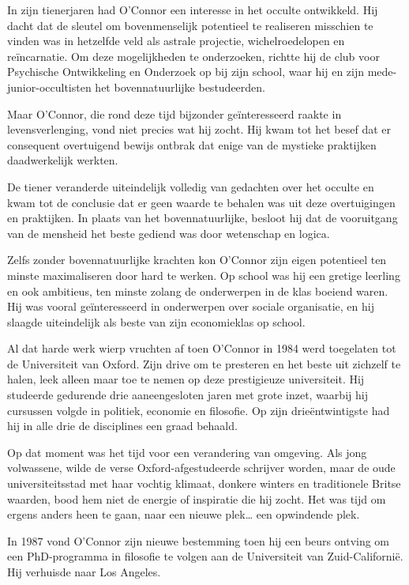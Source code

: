 \documentclass[
  a5paper,
  smalldemyvopaper,11pt,twoside,onecolumn,openright,extrafontsizes,
hidelinks]{memoir}
\begin{document}
In zijn tienerjaren had O'Connor een interesse in het occulte
ontwikkeld. Hij dacht dat de sleutel om bovenmenselijk potentieel te
realiseren misschien te vinden was in hetzelfde veld als astrale
projectie, wichelroedelopen en reïncarnatie. Om deze mogelijkheden te
onderzoeken, richtte hij de club voor Psychische Ontwikkeling en
Onderzoek op bij zijn school, waar hij en zijn mede-junior-occultisten
het bovennatuurlijke bestudeerden.

Maar O'Connor, die rond deze tijd bijzonder geïnteresseerd raakte in
levensverlenging, vond niet precies wat hij zocht. Hij kwam tot het
besef dat er consequent overtuigend bewijs ontbrak dat enige van de
mystieke praktijken daadwerkelijk werkten.

De tiener veranderde uiteindelijk volledig van gedachten over het
occulte en kwam tot de conclusie dat er geen waarde te behalen was uit
deze overtuigingen en praktijken. In plaats van het bovennatuurlijke,
besloot hij dat de vooruitgang van de mensheid het beste gediend was
door wetenschap en logica.

Zelfs zonder bovennatuurlijke krachten kon O'Connor zijn eigen
potentieel ten minste maximaliseren door hard te werken. Op school was
hij een gretige leerling en ook ambitieus, ten minste zolang de
onderwerpen in de klas boeiend waren. Hij was vooral geïnteresseerd in
onderwerpen over sociale organisatie, en hij slaagde uiteindelijk als
beste van zijn economieklas op school.

Al dat harde werk wierp vruchten af toen O'Connor in 1984 werd
toegelaten tot de Universiteit van Oxford. Zijn drive om te presteren en
het beste uit zichzelf te halen, leek alleen maar toe te nemen op deze
prestigieuze universiteit. Hij studeerde gedurende drie aaneengesloten
jaren met grote inzet, waarbij hij cursussen volgde in politiek,
economie en filosofie. Op zijn drieëntwintigste had hij in alle drie de
disciplines een graad behaald.

Op dat moment was het tijd voor een verandering van omgeving. Als jong
volwassene, wilde de verse Oxford-afgestudeerde schrijver worden, maar
de oude universiteitsstad met haar vochtig klimaat, donkere winters en
traditionele Britse waarden, bood hem niet de energie of inspiratie die
hij zocht. Het was tijd om ergens anders heen te gaan, naar een nieuwe
plek\ldots{} een opwindende plek.

In 1987 vond O'Connor zijn nieuwe bestemming toen hij een beurs ontving
om een PhD-programma in filosofie te volgen aan de Universiteit van
Zuid-Californië. Hij verhuisde naar Los Angeles.
\end{document}
